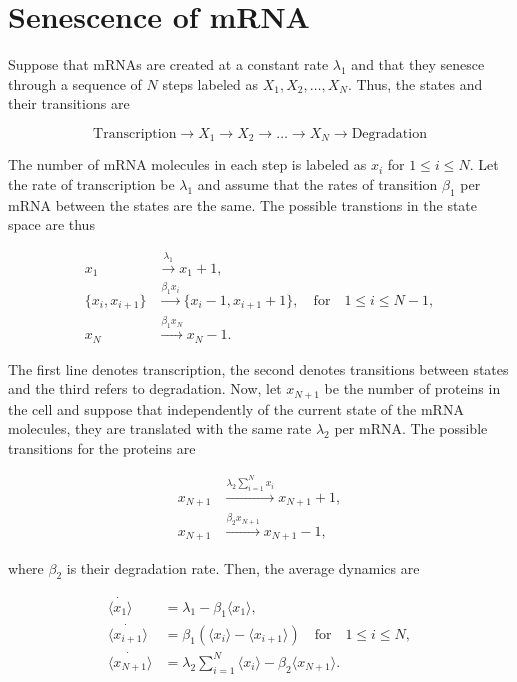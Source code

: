 \section{Senescence of mRNA}

Suppose that mRNAs are created at a constant rate $\lambda_1$ and that they senesce through a sequence of $N$ steps labeled as $X_1,X_2,\dotsc,X_N$. Thus, the states and their transitions are

\begin{equation*}
  \text{Transcription} \rightarrow X_1 \rightarrow X_2 \rightarrow \dots \rightarrow X_N \rightarrow \text{Degradation}
\end{equation*}

The number of mRNA molecules in each step is labeled as $x_i$ for $1\leq i\leq N$. Let the rate of transcription be $\lambda_1$ and assume that the rates of transition $\beta_1$ per mRNA between the states are the same. The possible transtions in the state space are thus

\begin{equation}
  \begin{split}
    x_1&\xrightarrow{\lambda_1}x_1+1,\\
    \{x_i,x_{i+1}\}&\xrightarrow{\beta_1x_i} \{x_i-1,x_{i+1}+1\},\quad \text{for}\quad1\leq i\leq N-1,\\
    x_N&\xrightarrow{\beta_1x_N} x_N-1.
  \end{split}
\end{equation}

The first line denotes transcription, the second denotes transitions between states and the third refers to degradation. Now, let $x_{N+1}$ be the number of proteins in the cell and suppose that independently of the current state of the mRNA molecules, they are translated with the same rate $\lambda_2$ per mRNA. The possible transitions for the proteins are

\begin{equation*}
  \begin{split}
    x_{N+1} &\xrightarrow{\lambda_2\sum_{i=1}^Nx_i} x_{N+1}+1,\\
    x_{N+1} &\xrightarrow{\beta_2x_{N+1}}x_{N+1}-1,
  \end{split}
\end{equation*}

where $\beta_2$ is their degradation rate. Then, the average dynamics are

\begin{equation*}
  \begin{split}
    \dot{\langle x_1\rangle} &= \lambda_1 -\beta_1\langle x_1\rangle,\\
    \dot{\langle x_{i+1}\rangle} &= \beta_1\left(\langle x_i\rangle - \langle x_{i+1}\rangle\right)\quad\text{for}\quad 1\leq i\leq N,\\
    \dot{\langle x_{N+1}\rangle} &= \lambda_2\sum_{i=1}^N\langle x_i\rangle-\beta_2\langle x_{N+1}\rangle.
  \end{split}
\end{equation*}

